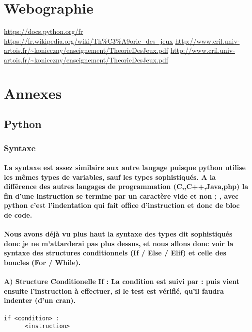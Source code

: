 \documentclass[a4paper, 12pt, twoside]{article}
\begin{document}
\section{Webographie}
\begin{thebibliography}{2}
    \url{https://docs.python.org/fr}\newline
   \url{https://fr.wikipedia.org/wiki/Th\%C3\%A9orie_des_jeux}\newline
   \url{http://www.cril.univ-artois.fr/~konieczny/enseignement/TheorieDesJeux.pdf}\newline
   \url{http://www.cril.univ-artois.fr/~konieczny/enseignement/TheorieDesJeux.pdf}\newline
\end{thebibliography}

\newpage
\section{Annexes}
\subsection{Python}
\subsubsection{Syntaxe}
\paragraph{
 La syntaxe est assez similaire aux autre langage puisque python utilise les mêmes types de variables, sauf les types sophistiqués. A la différence des autres langages de programmation (C,,C++,Java,php) la fin d'une instruction se termine par un caractère vide
et non  ; , avec python c'est l'indentation qui fait office d'instruction et donc de bloc de code.}
\paragraph{Nous avons déjà vu plus haut la syntaxe des types dit sophistiqués donc je ne m'attarderai pas plus dessus, et nous allons donc voir la syntaxe des structures conditionnels (If / Else / Elif) et celle des boucles (For / While).}

\paragraph{A) Structure Conditionelle If : \newline
La condition est suivi par  :  puis vient ensuite l'instruction à effectuer, si le test est vérifié, qu'il faudra indenter (d'un cran).}
\begin{verbatim}
if <condition> :
      <instruction>
\end{verbatim}
\end{document}
